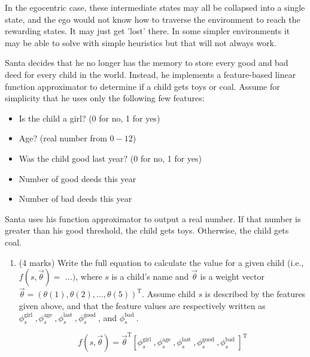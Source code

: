 \documentclass[addpoints,12pt,solution]{exam}
\begin{document}
\begin{questions}
\begin{solution}
\begin{itemize}
                In the egocentric case, these intermediate states may all be collapsed into a single state, and the ego
                would not know how to traverse the environment to reach the rewarding states. It may just get 'lost' there.
                In some simpler environments it may be able to solve with simple heuristics but that will not always work.
            \end{itemize}


        \end{solution}

        \question[12]
        Santa decides that he no longer has the memory to store every good and bad deed for every child in the world. Instead, he implements a feature-based linear function approximator to determine if a child gets toys or coal. Assume for simplicity that he uses only the following few features:

        \begin{itemize}
            \item Is the child a girl? (0 for no, 1 for yes)
            \item Age? (real number from $0-12$)
            \item Was the child good last year? (0 for no, 1 for yes)
            \item Number of good deeds this year
            \item Number of bad deeds this year
        \end{itemize}
        Santa uses his function approximator to output a real number. If that number is greater than his good threshold, the child gets toys. Otherwise, the child gets coal.
        \begin{enumerate}[label=(\alph*)]
            \item (4 marks) Write the full equation to calculate the value for a given child (i.e., $f(s, \vec{\theta})=$ $\ldots)$, where $s$ is a child's name and $\vec{\theta}$ is a weight vector $\vec{\theta}=(\theta(1), \theta(2), \ldots, \theta(5))^{\mathrm{T}}$. Assume child $s$ is described by the features given above, and that the feature values are respectively written as $\phi_{s}^{\text {girl }}, \phi_{s}^{\text {age }}, \phi_{s}^{\text {last }}, \phi_{s}^{\text {good }}$, and $\phi_{s}^{\text {bad }}$.
            \begin{solution}
                \[
                    f(s, \vec{\theta}) = \vec{\theta}^{\mathrm{T}}
                    [\phi_{s}^{\text {girl }}, \phi_{s}^{\text {age }}, \phi_{s}^{\text {last }}, \phi_{s}^{\text {good }}, \phi_{s}^{\text {bad }}]^{\mathrm{T}}
                \]


\end{solution}
\end{enumerate}
\end{questions}
\end{document}
